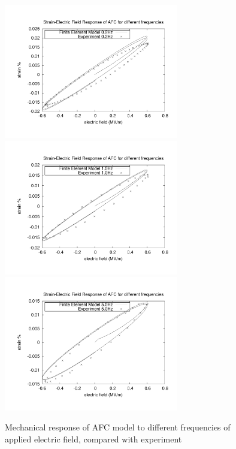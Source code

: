 \begin{figure} 
\centering
{}
{\includegraphics[width=3in]{./chap_4_structural_analyses/afc_unit_cell/wxp_different_frequencies/electric_field_vs_strains_for_different_frequencies_0p_2.pdf}}
{\includegraphics[width=3in]{./chap_4_structural_analyses/afc_unit_cell/wxp_different_frequencies/electric_field_vs_strains_for_different_frequencies_1p_0.pdf}}
{\includegraphics[trim = 0.5in 0in 0in 0in, clip, width=3in]{./chap_4_structural_analyses/afc_unit_cell/wxp_different_frequencies/electric_field_vs_strains_for_different_frequencies_5p_0.pdf}}
\caption{Mechanical response of AFC model to different frequencies of applied electric field, compared with experiment \cite{atillah2014}}
\label{afc_freq_xp_model:fig}
\end{figure}


